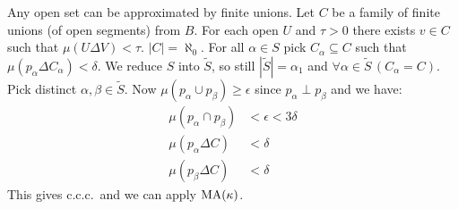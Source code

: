 \documentclass[11pt,pdftex,twoside,a4paper]{article}
\newcommand{\MA}{\ensuremath{\mathop{\rm MA}\nolimits}}
\newcommand{\ccc}{c.c.c.}
\begin{document}
Any open set can be approximated by finite unions.
Let $C$ be a family of finite unions (of open segments) from $B$.
For each open $U$ and \(\tau > 0\) there exists \(v\in C\)
such that \(\mu(U \Delta V) < \tau\).
\(|C|=\aleph_0\).
For all \(\alpha\in S\) pick \(C_\alpha\subseteq C\) such that
\(\mu(p_\alpha \Delta C_\alpha) < \delta\).
We reduce $S$ into \(\tilde{S}\), so still \(|\tilde{S}|=\alpha_1\)
and \(\forall \alpha\in\tilde{S}\,(C_\alpha=C)\).
Pick distinct \(\alpha,\beta\in \tilde{S}\).
Now \(\mu(p_\alpha\cup p_\beta) \geq \epsilon\) since \(p_\alpha\perp p_\beta\)
and we have:
\begin{align*}
 \mu(p_\alpha \cap p_\beta) &< \epsilon < 3\delta\\
  \mu(p_\alpha \Delta C) &< \delta \\
  \mu(p_\beta \Delta C) &< \delta
\end{align*}
This gives \ccc\ and we can apply \(\MA(\kappa)\).


\end{document}
